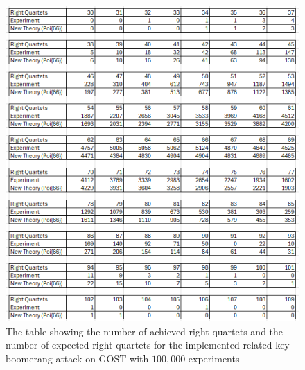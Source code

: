 \documentclass[10pt,journal,compsoc]{IEEEtran}
\begin{document}
\begin{appendices}
\begin{figure}[H]
    \centering
    \includegraphics[width=0.9\linewidth, keepaspectratio]{Figures/verBoomTableFull-100k.png}
    \caption{The table showing the number of achieved right quartets and the number of expected right quartets for the implemented related-key boomerang attack on GOST with \(100,000\) experiments}
    \label{fig:verboomfull-100k}
\end{figure}

\end{appendices}
\end{document}
